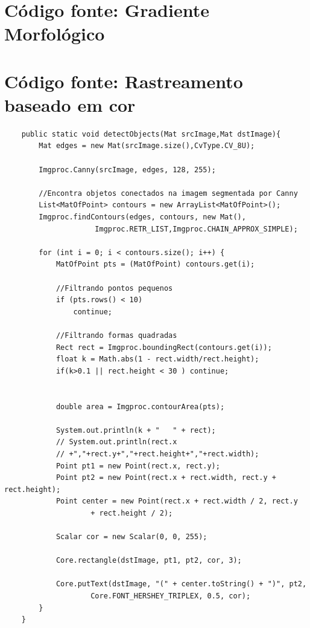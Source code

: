 \documentclass[
	article,			%
	11pt,				%
	oneside,			%
	a4paper,			%
	english,			%
	brazil,				%
	sumario=tradicional
	]{abntex2}
\newcommand{\matlabCodePath}{/home/clifte/git/Mestrado/Matlab/}
\begin{document}
\begin{apendicesenv}
\chapter{Código fonte: Gradiente Morfológico}
\label{apend:gradMorfCode}
\lstset{extendedchars=true,inputencoding=utf8/latin1}


\chapter{Código fonte: Rastreamento baseado em cor}
\label{apend:rast}
\lstset{extendedchars=true,inputencoding=utf8/latin1,language=java,frame=single,
numbers=left}

\begin{lstlisting}
	public static void detectObjects(Mat srcImage,Mat dstImage){
		Mat edges = new Mat(srcImage.size(),CvType.CV_8U);
		
		Imgproc.Canny(srcImage, edges, 128, 255);
		
		//Encontra objetos conectados na imagem segmentada por Canny
	    List<MatOfPoint> contours = new ArrayList<MatOfPoint>();
	    Imgproc.findContours(edges, contours, new Mat(),
	    			 Imgproc.RETR_LIST,Imgproc.CHAIN_APPROX_SIMPLE);

		for (int i = 0; i < contours.size(); i++) {
			MatOfPoint pts = (MatOfPoint) contours.get(i);
			
			//Filtrando pontos pequenos
			if (pts.rows() < 10)
				continue;
				
			//Filtrando formas quadradas
			Rect rect = Imgproc.boundingRect(contours.get(i));
			float k = Math.abs(1 - rect.width/rect.height);
			if(k>0.1 || rect.height < 30 ) continue;
			
			
			double area = Imgproc.contourArea(pts);
			
			System.out.println(k + "   " + rect);
			// System.out.println(rect.x
			// +","+rect.y+","+rect.height+","+rect.width);
			Point pt1 = new Point(rect.x, rect.y);
			Point pt2 = new Point(rect.x + rect.width, rect.y + rect.height);
			Point center = new Point(rect.x + rect.width / 2, rect.y
					+ rect.height / 2);

			Scalar cor = new Scalar(0, 0, 255);

			Core.rectangle(dstImage, pt1, pt2, cor, 3);

			Core.putText(dstImage, "(" + center.toString() + ")", pt2,
					Core.FONT_HERSHEY_TRIPLEX, 0.5, cor);
		}
	}
\end{lstlisting}


\end{apendicesenv}
\end{document}
